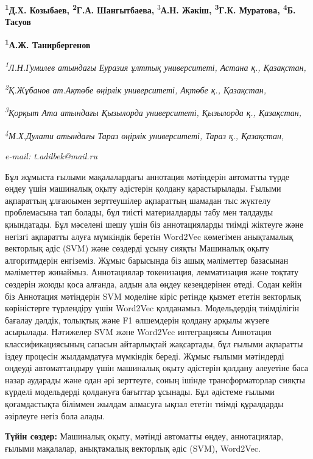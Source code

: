 {\bfseries \textsuperscript{1}Д.Х. Козыбаев, \textsuperscript{2}Г.А.
Шангытбаева,} \textsuperscript{3}{\bfseries А.Н. Жәкіш,
\textsuperscript{3}Г.К. Муратова, \textsuperscript{4}Б. Тасуов}

{\bfseries \textsuperscript{1}А.Ж. Танирбергенов\textsuperscript{\envelope }}

\emph{\textsuperscript{1}Л.Н.Гумилев атындағы Еуразия ұлттық
университеті, Астана қ., Қазақстан,}

\emph{\textsuperscript{2}Қ.Жұбанов ат.Ақтөбе өңірлік университеті,
Ақтөбе қ., Қазақстан,}

\emph{\textsuperscript{3}Қорқыт Ата атындағы Қызылорда университеті,
Қызылорда қ., Қазақстан,}

\emph{\textsuperscript{4}М.Х.Дулати атындағы Тараз өңірлік университеті,
Тараз қ., Қазақстан,}

\emph{e-mail: t.adilbek@mail.ru}

Бұл жұмыста ғылыми мақалалардағы аннотация мәтіндерін автоматты түрде
өңдеу үшін машиналық оқыту әдістерін қолдану қарастырылады. Ғылыми
ақпараттың ұлғаюымен зерттеушілер ақпараттың шамадан тыс жүктелу
проблемасына тап болады, бұл тиісті материалдарды табу мен талдауды
қиындатады. Бұл мәселені шешу үшін біз аннотацияларды тиімді жіктеуге
және негізгі ақпаратты алуға мүмкіндік беретін Word2Vec көмегімен
анықтамалық векторлық әдіс (SVM) және сөздерді ұсыну сияқты Машиналық
оқыту алгоритмдерін енгіземіз. Жұмыс барысында біз ашық мәліметтер
базасынан мәліметтер жинаймыз. Аннотациялар токенизация, лемматизация
және тоқтату сөздерін жоюды қоса алғанда, алдын ала өңдеу кезеңдерінен
өтеді. Содан кейін біз Аннотация мәтіндерін SVM моделіне кіріс ретінде
қызмет ететін векторлық көріністерге түрлендіру үшін Word2Vec
қолданамыз. Модельдердің тиімділігін бағалау дәлдік, толықтық және F1
өлшемдерін қолдану арқылы жүзеге асырылады. Нәтижелер SVM және Word2Vec
интеграциясы Аннотация классификациясының сапасын айтарлықтай
жақсартады, бұл ғылыми ақпаратты іздеу процесін жылдамдатуға мүмкіндік
береді. Жұмыс ғылыми мәтіндерді өңдеуді автоматтандыру үшін машиналық
оқыту әдістерін қолдану әлеуетіне баса назар аударады және одан әрі
зерттеуге, соның ішінде трансформаторлар сияқты күрделі модельдерді
қолдануға бағыттар ұсынады. Бұл әдістеме ғылыми қоғамдастықта біліммен
жылдам алмасуға ықпал ететін тиімді құралдарды әзірлеуге негіз бола
алады.

{\bfseries Түйін сөздер:} Машиналық оқыту, мәтінді автоматты өңдеу,
аннотациялар, ғылыми мақалалар, анықтамалық векторлық әдіс (SVM),
Word2Vec.

